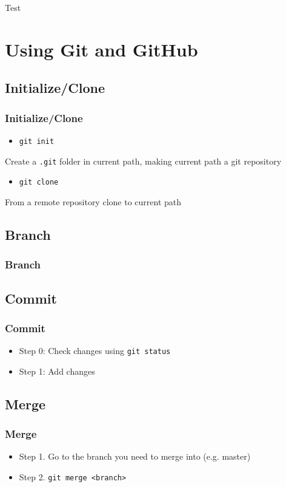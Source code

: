\documentclass{beamer}
\begin{document}
			Test

	\section{Using Git and GitHub}
		\subsection{Initialize/Clone}
			\begin{frame}
				\frametitle{Initialize/Clone}
				\begin{itemize}
					\item \texttt{git init}
				\end{itemize}
				Create a \texttt{.git} folder in current path, making current path a git repository

				\begin{itemize}
					\item \texttt{git clone}
				\end{itemize}
				From a remote repository clone to current path
			\end{frame}

		\subsection{Branch}
			\begin{frame}
				\frametitle{Branch}
			\end{frame}

		\subsection{Commit}
			\begin{frame}
				\frametitle{Commit}
				\begin{itemize}
					\item Step 0: Check changes using \texttt{git status}
					\item Step 1: Add changes
				\end{itemize}
			\end{frame}

		\subsection{Merge}
			\begin{frame}
				\frametitle{Merge}
				\begin{itemize}
					\item Step 1. Go to the branch you need to merge into (e.g. master)
					\item Step 2. \texttt{git merge <branch>}
				\end{itemize}
			\end{frame}
\end{document}
